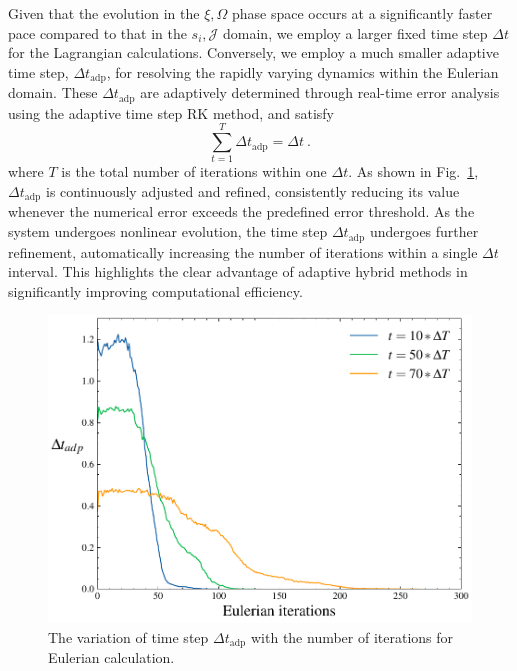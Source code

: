 Given that the evolution in the $\xi,\Omega$  phase space occurs at a significantly faster pace compared to that in the $s_i,\mathcal{J}$ domain, we employ a larger fixed time step $\Delta t$ for the Lagrangian calculations. Conversely, we employ a much smaller adaptive time step, $\Delta t_\mathrm{adp}$, for resolving the rapidly varying dynamics within the Eulerian domain. These $\Delta t_\mathrm{adp}$ are adaptively determined through real-time error analysis using the adaptive time step RK method, and satisfy
\begin{equation}
    \sum_{t=1}^T \Delta t_\mathrm{adp} = \Delta t ~.
\end{equation}
where $T$ is the total number of iterations within one $\Delta t$. 
As shown in Fig.~\ref{fig.adapetive}, 
$\Delta t_\mathrm{adp}$ is continuously adjusted and refined, consistently reducing its value whenever the numerical error exceeds the predefined error threshold. As the system undergoes nonlinear evolution, the time step $\Delta t_\mathrm{adp}$ undergoes further refinement, automatically increasing the number of iterations within a single $\Delta t$ interval. This highlights the clear advantage of adaptive hybrid methods in significantly improving computational efficiency.
\begin{figure}[htbp]
    \centering
    \includegraphics[scale=0.5]{cpc_img/fig_dts1.pdf}
    \caption{The variation of time step $\Delta t_\mathrm{adp}$ with the number of iterations for Eulerian calculation.  
    }
    \label{fig.adapetive}
\end{figure}
